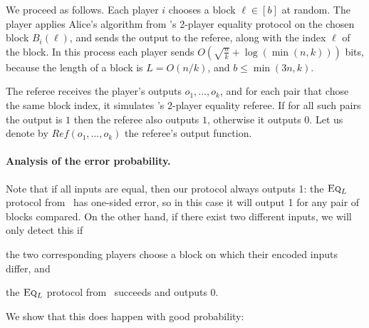	We proceed as follows.
	Each player $i$ chooses a block $\ell \in [b]$ at random. The player applies Alice's algorithm from \cite{BK97}'s 2-player equality protocol on the chosen block $B_i(\ell)$, and sends the output to the referee, along with the index $\ell$ of the block. In this process each player sends $O(\sqrt{\frac{n}{k}}+\log{(\min(n,k))})$ bits, because the length of a block is $L = O(n/k)$, and $b \leq \min(3n,k)$.
	
	The referee receives the player's outputs $o_1,...,o_k$, and for each pair that chose the same block index, it simulates \cite{BK97}'s 2-player equality referee. If for all such pairs the output is $1$ then the referee also outputs $1$, otherwise it outputs $0$.
	Let us denote by $Ref(o_1,\ldots,o_k)$ the referee's output function.

	\paragraph{Analysis of the error probability.}
	Note that if all inputs are equal, then our protocol always outputs 1: the $\text{\textsc{Eq}}_L$ protocol from~\cite{BK97} has one-sided error,
	so in this case it will output 1
	for any pair of blocks compared.
	On the other hand, if there exist two different inputs, we will only detect this if
	\begin{inparaenum}[(a)]
	\item the two corresponding players choose a block on which their encoded inputs differ, and
	\item the $\text{\textsc{Eq}}_L$ protocol from~\cite{BK97} succeeds and outputs $0$.
	\end{inparaenum}
	We show that this does happen with good probability:
	
